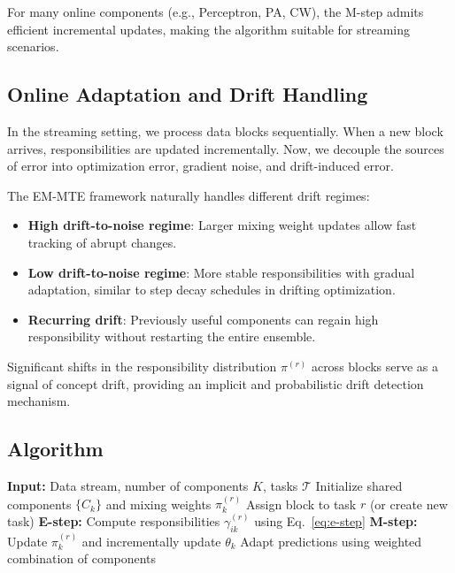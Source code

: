 \documentclass[12pt,a4paper]{article}
\begin{document}
For many online components (e.g., Perceptron, PA, CW), the M-step admits efficient incremental updates, making the algorithm suitable for streaming scenarios.







\subsection{Online Adaptation and Drift Handling}

In the streaming setting, we process data blocks sequentially. When a new block arrives, responsibilities are updated incrementally. Now, we decouple the sources of error into optimization error, gradient noise, and drift-induced error.

The EM-MTE framework naturally handles different drift regimes:
\begin{itemize}
	\item \textbf{High drift-to-noise regime}: Larger mixing weight updates allow fast tracking of abrupt changes.
	\item \textbf{Low drift-to-noise regime}: More stable responsibilities with gradual adaptation, similar to step decay schedules in drifting optimization.
	\item \textbf{Recurring drift}: Previously useful components can regain high responsibility without restarting the entire ensemble.
\end{itemize}

Significant shifts in the responsibility distribution $\pi^{(r)}$ across blocks serve as a signal of concept drift, providing an implicit and probabilistic drift detection mechanism.







\subsection{Algorithm}

\begin{algorithm}[ht]
	\caption{EM-MTE: EM-based Multi-Task Ensemble for Streaming Data}
	\begin{algorithmic}[1]
		\STATE \textbf{Input:} Data stream, number of components $K$, tasks $\mathcal{T}$
		\STATE Initialize shared components $\{C_k\}$ and mixing weights $\pi_k^{(r)}$
		\STATE Assign block to task $r$ (or create new task)
		\STATE \textbf{E-step:} Compute responsibilities $\gamma_{ik}^{(r)}$ using Eq.~\eqref{eq:e-step}
		\STATE \textbf{M-step:} Update $\pi_k^{(r)}$ and incrementally update $\theta_k$
		\ENDFOR
		\STATE Adapt predictions using weighted combination of components
		\ENDFOR
	\end{algorithmic}
\end{algorithm}
\end{document}
